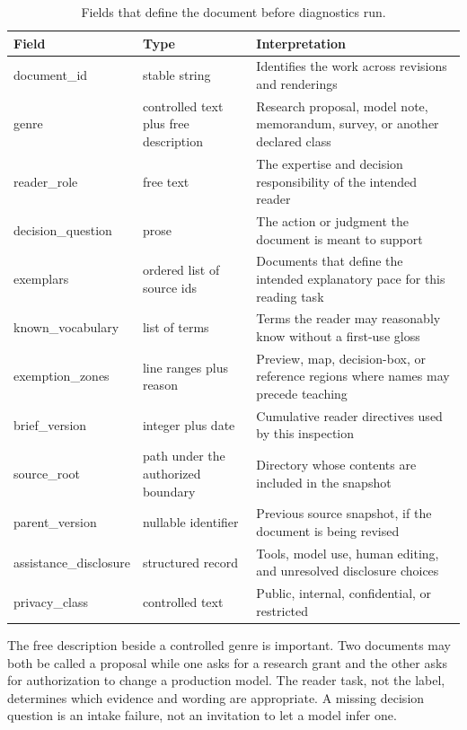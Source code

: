 \begin{table}[H]
\centering
\small
\begin{tabularx}{\textwidth}{@{}p{}p{}L@{}}
\toprule
Field & Type & Interpretation \\
\midrule
document\_id & stable string & Identifies the work across revisions and
renderings \\
genre & controlled text plus free description & Research proposal, model note,
memorandum, survey, or another declared class \\
reader\_role & free text & The expertise and decision responsibility of the
intended reader \\
decision\_question & prose & The action or judgment the document is meant to
support \\
exemplars & ordered list of source ids & Documents that define the intended
explanatory pace for this reading task \\
known\_vocabulary & list of terms & Terms the reader may reasonably know
without a first-use gloss \\
exemption\_zones & line ranges plus reason & Preview, map, decision-box, or
reference regions where names may precede teaching \\
brief\_version & integer plus date & Cumulative reader directives used by this
inspection \\
source\_root & path under the authorized boundary & Directory whose contents
are included in the snapshot \\
parent\_version & nullable identifier & Previous source snapshot, if the
document is being revised \\
assistance\_disclosure & structured record & Tools, model use, human editing,
and unresolved disclosure choices \\
privacy\_class & controlled text & Public, internal, confidential, or restricted \\
\bottomrule
\end{tabularx}
\caption{Fields that define the document before diagnostics run.}
\label{tab:manual-document-fields}
\end{table}

The free description beside a controlled genre is important. Two documents may
both be called a proposal while one asks for a research grant and the other asks
for authorization to change a production model. The reader task, not the label,
determines which evidence and wording are appropriate. A missing decision
question is an intake failure, not an invitation to let a model infer one.

